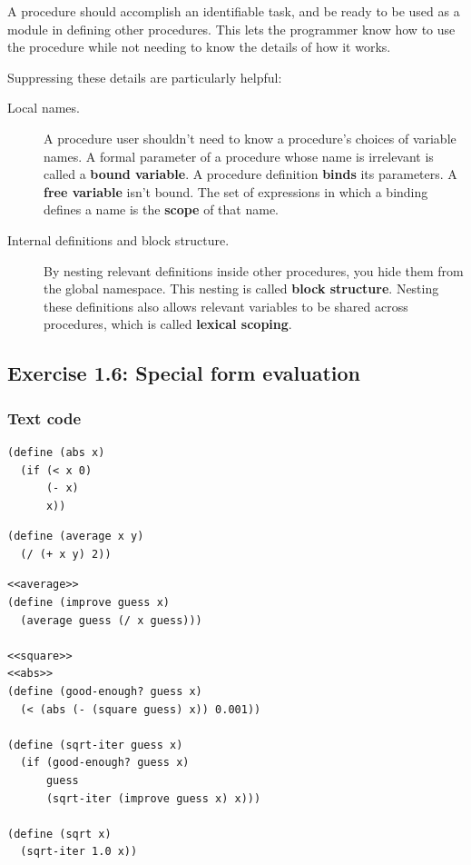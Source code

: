 \documentclass[final,fleqn,titlepage,twoside]{article}
\begin{document}
A procedure should accomplish an identifiable task, and be ready to be used as a
module in defining other procedures. This lets the programmer know how to use
the procedure while not needing to know the details of how it works.

Suppressing these details are particularly helpful:
\begin{description}
\item[{Local names.}] A procedure user shouldn't need to know a procedure's choices
of variable names. A formal parameter of a procedure whose name is irrelevant
is called a \textbf{bound variable}. A procedure definition \textbf{binds} its parameters. A
\textbf{free variable} isn't bound. The set of expressions in which a binding defines
a name is the \textbf{scope} of that name.
\item[{Internal definitions and block structure.}] By nesting relevant definitions
inside other procedures, you hide them from the global namespace. This nesting
is called \textbf{block structure}. Nesting these definitions also allows relevant
variables to be shared across procedures, which is called \textbf{lexical scoping}.
\end{description}

\subsection{Exercise 1.6: Special form evaluation}
\label{sec:org51c850c}
\subsubsection{Text code}
\label{sec:org06e5fd8}
\begin{verbatim}
(define (abs x)
  (if (< x 0)
      (- x)
      x))
\end{verbatim}
\begin{verbatim}
(define (average x y)
  (/ (+ x y) 2))
\end{verbatim}
\begin{verbatim}
<<average>>
(define (improve guess x)
  (average guess (/ x guess)))

<<square>>
<<abs>>
(define (good-enough? guess x)
  (< (abs (- (square guess) x)) 0.001))

(define (sqrt-iter guess x)
  (if (good-enough? guess x)
      guess
      (sqrt-iter (improve guess x) x)))

(define (sqrt x)
  (sqrt-iter 1.0 x))
\end{verbatim}
\end{document}

